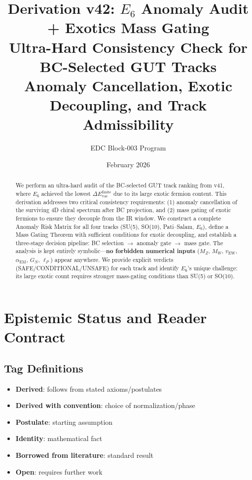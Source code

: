 \documentclass[11pt,a4paper]{article}
\title{\textbf{Derivation v42: $E_6$ Anomaly Audit + Exotics Mass Gating} \\[0.5em]
\large Ultra-Hard Consistency Check for BC-Selected GUT Tracks \\
Anomaly Cancellation, Exotic Decoupling, and Track Admissibility}
\author{EDC Block-003 Program}
\date{February 2026}
\newcommand{\tagD}{\textcolor{blue!70!black}{[D]}}
\newcommand{\tagDc}{\textcolor{blue!50!black}{[Dc]}}
\newcommand{\tagP}{\textcolor{green!50!black}{[P]}}
\newcommand{\tagI}{\textcolor{gray}{[I]}}
\newcommand{\tagBL}{\textcolor{purple}{[BL]}}
\newcommand{\tagOPEN}{\textcolor{red!70!black}{[OPEN]}}
\begin{document}
\maketitle

\begin{abstract}
We perform an ultra-hard audit of the BC-selected GUT track ranking from v41,
where $E_6$ achieved the lowest $\Delta E_{\text{vac}}^{\text{finite}}$ due to
its large exotic fermion content. This derivation addresses two critical
consistency requirements: (1) anomaly cancellation of the surviving 4D chiral
spectrum after BC projection, and (2) mass gating of exotic fermions to ensure
they decouple from the IR window. We construct a complete Anomaly Risk Matrix
for all four tracks (SU(5), SO(10), Pati--Salam, $E_6$), define a Mass Gating
Theorem with sufficient conditions for exotic decoupling, and establish a
three-stage decision pipeline: BC selection $\to$ anomaly gate $\to$ mass gate.
The analysis is kept entirely symbolic---\textbf{no forbidden numerical inputs}
($M_Z$, $M_W$, $v_{\text{EW}}$, $\alpha_{\text{EM}}$, $G_N$, $\ell_P$) appear
anywhere. We provide explicit verdicts (SAFE/CONDITIONAL/UNSAFE) for each track
and identify $E_6$'s unique challenge: its large exotic count requires stronger
mass-gating conditions than SU(5) or SO(10).
\end{abstract}

\tableofcontents
\newpage

\section{Epistemic Status and Reader Contract}
\label{sec:epistemic}

\subsection{Tag Definitions}

\begin{itemize}[leftmargin=2cm]
    \item[\tagD] \textbf{Derived}: follows from stated axioms/postulates
    \item[\tagDc] \textbf{Derived with convention}: choice of normalization/phase
    \item[\tagP] \textbf{Postulate}: starting assumption
    \item[\tagI] \textbf{Identity}: mathematical fact
    \item[\tagBL] \textbf{Borrowed from literature}: standard result
    \item[\tagOPEN] \textbf{Open}: requires further work
\end{itemize}
\end{document}
